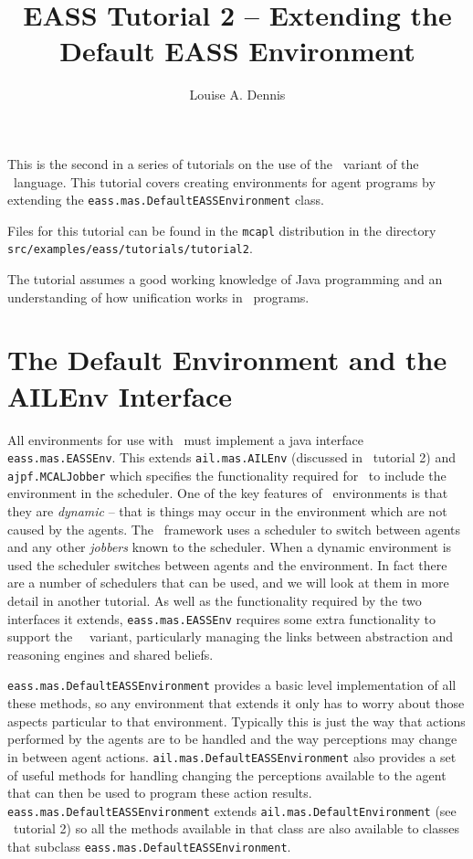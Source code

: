 \documentclass[a4]{article}
\author{Louise A. Dennis}
\title{EASS Tutorial 2 -- Extending the Default EASS Environment}
\begin{document}
\maketitle
This is the second in a series of tutorials on the use of the \eass\ variant of the \gwendolen\ language.  This tutorial covers creating environments for agent programs by extending the \texttt{eass.mas.DefaultEASSEnvironment} class.  

Files for this tutorial can be found in the \texttt{mcapl} distribution in the directory \texttt{src/examples/eass/tutorials/tutorial2}.

The tutorial assumes a good working knowledge of Java programming and an understanding of how unification works in \prolog\ programs.

\section{The Default Environment and the AILEnv Interface}
\begin{sloppypar}
All environments for use with \eass\ must implement a java interface \texttt{eass.mas.EASSEnv}.  This extends \texttt{ail.mas.AILEnv} (discussed in \ail\ tutorial 2) and \texttt{ajpf.MCALJobber} which specifies the functionality required for \ajpf\ to include the environment in the scheduler.  One of the key features of \eass\ environments is that they are \emph{dynamic} -- that is things may occur in the environment which are not caused by the agents.  The \ajpf\ framework uses a scheduler to switch between agents and any other \emph{jobbers} known to the scheduler.  When a dynamic environment is used the scheduler switches between agents and the environment.  In fact there are a number of schedulers that can be used, and we will look at them in more detail in another tutorial.  As well as the functionality required by the two interfaces it extends, \texttt{eass.mas.EASSEnv} requires some extra functionality to support the \eass\ \gwendolen\ variant, particularly managing the links between abstraction and reasoning engines and shared beliefs.

\texttt{eass.mas.DefaultEASSEnvironment} provides a basic level implementation of all these methods, so any environment that extends it only has to worry about those aspects particular to that environment.  Typically this is just the way that actions performed by the agents are to be handled and the way perceptions may change in between agent actions.  \texttt{ail.mas.DefaultEASSEnvironment} also provides a set of useful methods for handling changing the perceptions available to the agent that can then be used to program these action results.  \texttt{eass.mas.DefaultEASSEnvironment} extends \texttt{ail.mas.DefaultEnvironment} (see \ail\ tutorial 2) so all the methods available in that class are also available to classes that subclass \texttt{eass.mas.DefaultEASSEnvironment}.
\end{sloppypar}
\end{document}
